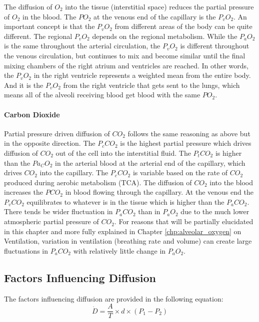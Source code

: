 The diffusion of $O_2$ into the tissue (interstitial space) reduces the partial pressure of $O_2$ in the blood. The $PO_2$ at the venous end of the capillary is the $P_vO_2$. An important concept is that the $P_vO_2$ from different areas of the body can be quite different. The regional $P_vO_2$ depends on the regional metabolism. While the $P_aO_2$ is the same throughout the arterial circulation, the $P_vO_2$ is different throughout the venous circulation, but continues to mix and become similar until the final mixing chambers of the right atrium and ventricles are reached. In other words, the $P_vO_2$ in the right ventricle represents a weighted mean from the entire body. And it is the $P_vO_2$ from the right ventricle that gets sent to the lungs, which means all of the alveoli receiving blood get blood with the same $PO_2$.

\paragraph{Carbon Dioxide}

Partial pressure driven diffusion of $CO_2$ follows the same reasoning as above but in the opposite direction. The $P_cCO_2$ is the highest partial pressure which drives diffusion of $CO_2$ out of the cell into the interstitial fluid. The $P_tCO_2$ is higher than the $Pa_CO_2$ in the arterial blood at the arterial end of the capillary, which drives $CO_2$ into the capillary. The $P_cCO_2$ is variable based on the rate of $CO_2$ produced during aerobic metabolism (TCA). The diffusion of $CO_2$ into the blood increases the $PCO_2$ in blood flowing through the capillary. At the venous end the $P_vCO_2$ equilibrates to whatever is in the tissue which is higher than the $P_aCO_2$. There tends be wider fluctuation in $P_aCO_2$ than in $P_aO_2$ due to the much lower atmospheric partial pressure of $CO_2$. For reasons that will be partially elucidated in this chapter and more fully explained in Chapter \ref{chp:alveolar_oxygen} on Ventilation, variation in ventilation (breathing rate and volume) can create large fluctuations in $P_aCO_2$ with relatively little change in $P_aO_2$. 

\subsection{Factors Influencing Diffusion}

The factors influencing diffusion are provided in the following equation:
\vspace{4 mm}
\begin{equation}
    \dot{D} = \frac{A}{T} \times d \times (P_1 - P_2)
    \label{diffusion}
\end{equation}
\vspace{4mm}


